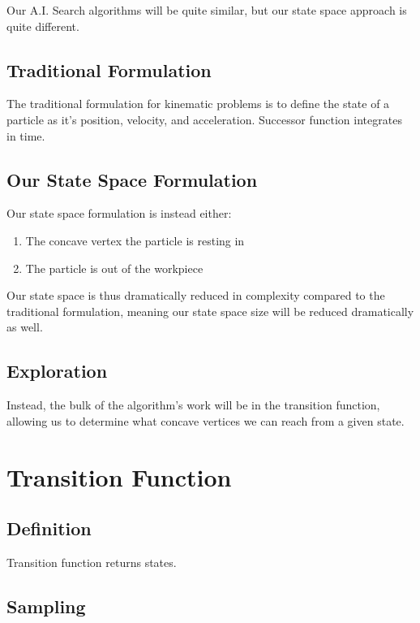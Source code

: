 Our A.I. Search algorithms will be quite similar, but our state space approach is quite different.

	\subsection{Traditional Formulation}

The traditional formulation for kinematic problems is to define the state of a particle as it's position, velocity, and acceleration. Successor function integrates in time.

	\subsection{Our State Space Formulation}

Our state space formulation is instead either:

\begin{enumerate}
\item The concave vertex the particle is resting in
\item The particle is out of the workpiece
\end{enumerate}

Our state space is thus dramatically reduced in complexity compared to the traditional formulation, meaning our state space size will be reduced dramatically as well.

	\subsection{Exploration}

	Instead, the bulk of the algorithm's work will be in the transition function, allowing us to determine what concave vertices we can reach from a given state.

\section{Transition Function}


	\subsection{Definition}

Transition function returns states.

	\subsection{Sampling}

